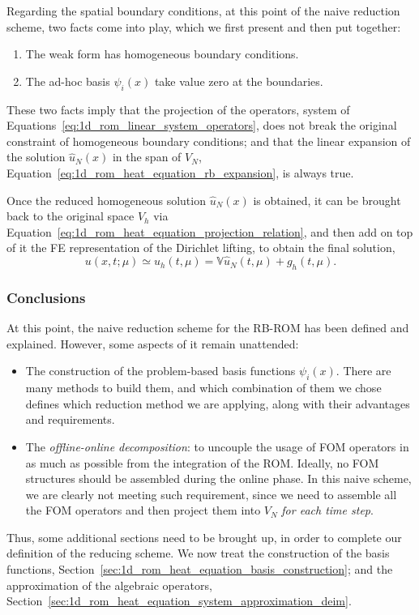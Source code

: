 \documentclass[../../1_heat_equation.tex]{subfiles}
\newcommand{\rbV}{\ensuremath{\mathbb{V}}}
\begin{document}
Regarding the spatial boundary conditions, at this point of the naive reduction scheme, two facts come into play, which we first present and then put together:
\begin{enumerate}
    \item The weak form has homogeneous boundary conditions.
    \item The ad-hoc basis $\psi_i(x)$ take value zero at the boundaries.
\end{enumerate}
These two facts imply that the projection of the operators, system of Equations~\eqref{eq:1d_rom_linear_system_operators}, does not break the original constraint of homogeneous boundary conditions;
and that the linear expansion of the solution $\hat{u}_N(x)$ in the span of $V_N$, Equation~\eqref{eq:1d_rom_heat_equation_rb_expansion}, is always true.

Once the reduced homogeneous solution $\hat{u}_N(x)$ is obtained, it can be brought back to the original space $V_h$ via Equation~\eqref{eq:1d_rom_heat_equation_projection_relation}, and then add on top of it the FE representation of the Dirichlet lifting, to obtain the final solution,
\begin{equation}
    u(x, t; \mu) \simeq u_h(t, \mu) = \rbV \hat{u}_N(t, \mu) + g_h(t,\mu).
\end{equation}

\subsubsection{Conclusions}
At this point, the naive reduction scheme for the RB-ROM has been defined and explained.
However, some aspects of it remain unattended:
\begin{itemize}
    \item The construction of the problem-based basis functions $\psi_i(x)$.
    There are many methods to build them, and which combination of them we chose defines which reduction method we are applying, along with their advantages and requirements.
    \item The \emph{offline-online decomposition}: to uncouple the usage of FOM operators in as much as possible from the integration of the ROM. 
    Ideally, no FOM structures should be assembled during the online phase.
    In this naive scheme, we are clearly not meeting such requirement, since we need to assemble all the FOM operators and then project them into $V_N$ \emph{for each time step}.
\end{itemize}
Thus, some additional sections need to be brought up, in order to complete our definition of the reducing scheme.
We now treat the construction of the basis functions, Section~\ref{sec:1d_rom_heat_equation_basis_construction}; and the approximation of the algebraic operators, Section~\ref{sec:1d_rom_heat_equation_system_approximation_deim}.
\end{document}
